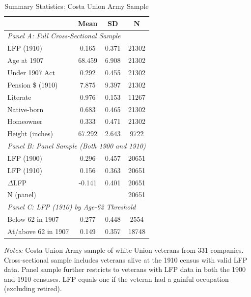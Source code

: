 \begin{table}[htbp]
\centering
\caption{Summary Statistics: Costa Union Army Sample}
\label{tab:summary}
\begin{tabular}{lccc}
\toprule
  & Mean & SD & N \\
\midrule
\multicolumn{4}{l}{\textit{Panel A: Full Cross-Sectional Sample}} \\
  LFP (1910) & 0.165 & 0.371 & 21302 \\
  Age at 1907 & 68.459 & 6.908 & 21302 \\
  Under 1907 Act & 0.292 & 0.455 & 21302 \\
  Pension \$ (1910) & 7.875 & 9.397 & 21302 \\
  Literate & 0.976 & 0.153 & 11267 \\
  Native-born & 0.683 & 0.465 & 21302 \\
  Homeowner & 0.333 & 0.471 & 21302 \\
  Height (inches) & 67.292 & 2.643 & 9722 \\
\midrule
\multicolumn{4}{l}{\textit{Panel B: Panel Sample (Both 1900 and 1910)}} \\
  LFP (1900) & 0.296 & 0.457 & 20651 \\
  LFP (1910) & 0.156 & 0.363 & 20651 \\
  $\Delta$LFP & -0.141 & 0.401 & 20651 \\
  N (panel) & & & 20651 \\
\midrule
\multicolumn{4}{l}{\textit{Panel C: LFP (1910) by Age-62 Threshold}} \\
  Below 62 in 1907 & 0.277 & 0.448 & 2554 \\
  At/above 62 in 1907 & 0.149 & 0.357 & 18748 \\
\bottomrule
\end{tabular}
\begin{tablenotes}[flushleft]
\small
\item \textit{Notes:} Costa Union Army sample of white Union veterans from 331 companies. Cross-sectional sample includes veterans alive at the 1910 census with valid LFP data. Panel sample further restricts to veterans with LFP data in both the 1900 and 1910 censuses. LFP equals one if the veteran had a gainful occupation (excluding retired).
\end{tablenotes}
\end{table}
